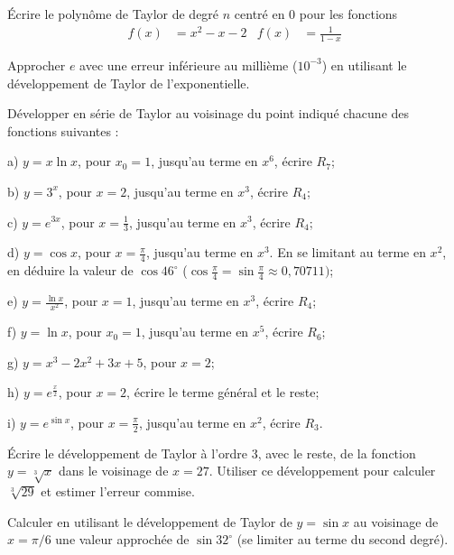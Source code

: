 \documentclass[12pt,french,oneside,a4paper]{memoir} %
\begin{document}
\begin{exo}
Écrire le polynôme de Taylor de degré $n$ centré en $0$ pour les fonctions
\begin{align*}
f(x) &= x^{2} - x - 2 & f(x)&= \frac{1}{1-x}
\end{align*}
\end{exo}

\begin{exo}
Approcher $e$ avec une erreur inférieure au millième ($10^{-3}$) en utilisant le développement de Taylor de l'exponentielle.
\end{exo}
\begin{exo}
Développer en série de Taylor au voisinage du point
indiqué chacune des fonctions suivantes :

a) $y=x\ln x$, pour $x_0=1$, jusqu'au terme en $x^6$,
écrire $R_7$;

b) $y=3^x$, pour $x=2$, jusqu'au terme en $x^3$, écrire $R_4$;

c) $y=e^{3x}$, pour $x=\displaystyle{\frac{1}{3}}$, 
jusqu'au terme en $x^3$, écrire $R_4$;

d) $y=\cos x$, pour $x=\displaystyle{\frac{\pi}{4}}$, 
jusqu'au terme en $x^3$. En se
limitant au terme en $x^2$, en déduire la valeur de $\cos
46^\circ$
($\cos\displaystyle{\frac{\pi}{4}=\sin\frac{\pi}{4}}\approx
0{,}70711)$;

e)  $y=\displaystyle{\frac{\ln x}{x^2}}$, pour $x=1$,
jusqu'au terme en $x^3$, écrire $R_4$;

f)  $y=\ln x$, pour $x_0=1$, jusqu'au terme en $x^5$,
écrire $R_6$;

g) $y=x^3-2x^2+3x+5$, pour $x=2$;

h) $y=\displaystyle{e^{\frac{x}{2}}}$, pour $x=2$, écrire le terme
général et le reste;

i) $y=\displaystyle{e^{\sin x}}$, pour
$x=\displaystyle{\frac{\pi}{2}}$, jusqu'au terme en $x^2$, écrire
$R_3$.
\end{exo}
\begin{exo}
Écrire le développement de Taylor à l'ordre 3, avec le
reste, de la fonction $y=\displaystyle{\sqrt[3] x}$ dans le
voisinage de $x=27$. Utiliser ce développement pour calculer
$\sqrt[3]{29}$ et estimer l'erreur commise.
\end{exo}
\begin{exo}
Calculer en utilisant le développement de Taylor de $y=\sin
x$ au voisinage de $x=\pi/6$ une valeur approchée de $\sin
32^\circ$ (se limiter au terme du second degré).
\end{exo}
\end{document}
